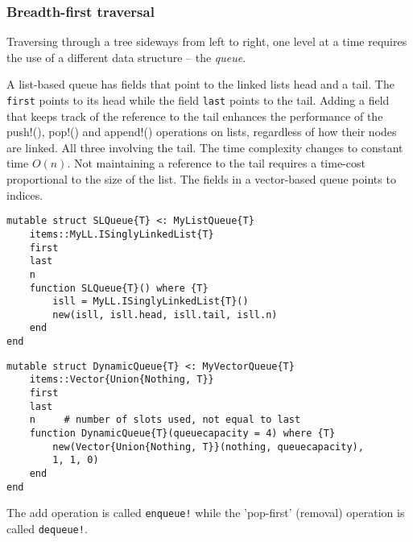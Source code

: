 \documentclass[a4paper, 11pt]{article}
\begin{document}
    

   \clearpage 
    \subsubsection*{Breadth-first traversal}
    \label{sec:breadthfirsttraversal}
    Traversing through a tree sideways from left to right, one level at a time requires 
    the use of a different data structure -- the \emph{queue}. 

    A list-based queue has fields that point to the linked lists head and a tail. The
    \texttt{first} points to its head while the field
    \texttt{last} points to the tail. 
    Adding a field that keeps track of the reference to the tail enhances the 
    performance of the push!(), pop!() and append!() operations on lists, 
    regardless of how their nodes are linked. All three involving the tail. 
    The time complexity changes to constant time
    $O(n)$.  Not maintaining a reference to the tail requires a time-cost proportional to the 
    size of the list. The fields in a vector-based queue points to indices. 
    \begin{verbatim}
mutable struct SLQueue{T} <: MyListQueue{T}
    items::MyLL.ISinglyLinkedList{T}
    first
    last
    n
    function SLQueue{T}() where {T}
        isll = MyLL.ISinglyLinkedList{T}()
        new(isll, isll.head, isll.tail, isll.n)
    end
end
    \end{verbatim}
    \begin{verbatim}
mutable struct DynamicQueue{T} <: MyVectorQueue{T}
    items::Vector{Union{Nothing, T}}
    first
    last
    n     # number of slots used, not equal to last
    function DynamicQueue{T}(queuecapacity = 4) where {T}
        new(Vector{Union{Nothing, T}}(nothing, queuecapacity), 
        1, 1, 0)
    end
end
    \end{verbatim}
The add operation is called \texttt{enqueue!} while the 'pop-first'
(removal) operation is called \texttt{dequeue!}. 
\end{document}

